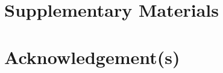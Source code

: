 \documentclass[]{interact}
\theoremstyle{plain}%
\theoremstyle{definition}
\theoremstyle{remark}
\begin{document}
\hypertarget{supplementary-materials}{%
\section*{Supplementary Materials}\label{supplementary-materials}}

\hypertarget{acknowledgements}{%
\section*{Acknowledgement(s)}\label{acknowledgements}}



\end{document}
